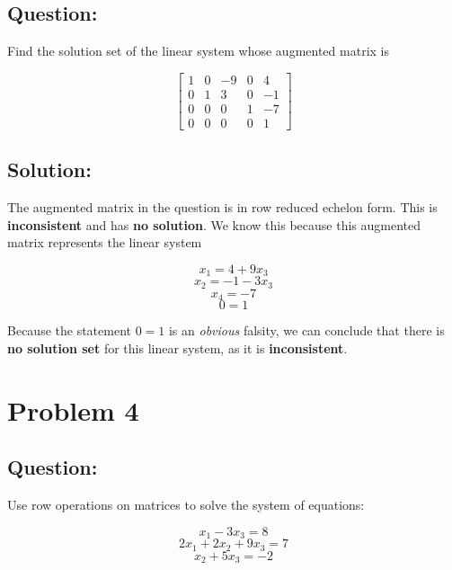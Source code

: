 \documentclass{article}
\begin{document}
\subsection*{Question:}
Find the solution set of the linear system whose augmented matrix is 

\[
\begin{bmatrix}
1 & 0 & -9 & 0 & 4 \\
0 & 1 & 3 & 0 & -1 \\
0 & 0 & 0 & 1 & -7 \\
0 & 0 & 0 & 0 & 1
\end{bmatrix}
\] 

\subsection*{Solution:}

The augmented matrix in the question is in row reduced echelon form. This is \textbf{inconsistent} and has \textbf{no solution}. We know this because this augmented matrix represents the linear system 

$$x_{1} = 4 + 9x_{3}$$
$$x_{2} = -1 - 3x_{3}$$
$$x_{4} = -7$$
$$0 = 1$$

Because the statement $0 = 1$ is an \textit{obvious} falsity, we can conclude that there is \textbf{no solution set} for this linear system, as it is \textbf{inconsistent}.

\section*{Problem 4}
\subsection*{Question:}
Use row operations on matrices to solve the system of equations: 

$$x_{1} - 3x_{3} = 8$$
$$2x_{1} + 2x_{2} + 9x_{3} = 7$$
$$x_{2} + 5x_{3} = -2$$
\end{document}
